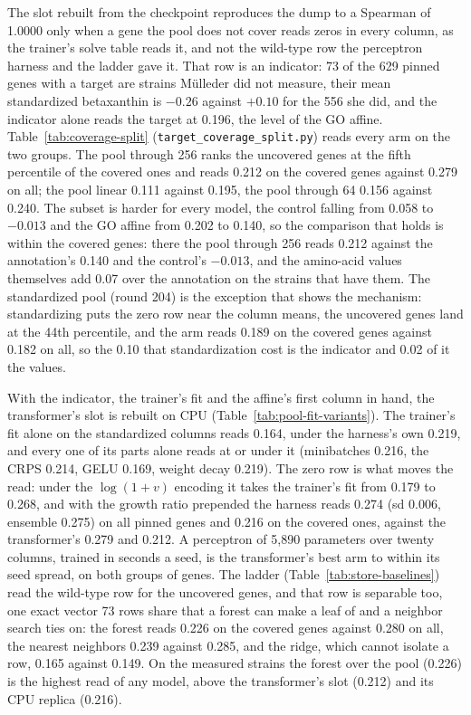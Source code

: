 The slot rebuilt from the checkpoint reproduces the dump to a Spearman of 1.0000 only
when a gene the pool does not cover reads zeros in every column, as the trainer's solve
table reads it, and not the wild-type row the perceptron harness and the ladder gave
it. That row is an indicator: 73 of the 629 pinned genes with a target are strains
M\"ulleder did not measure, their mean standardized betaxanthin is $-0.26$ against
$+0.10$ for the 556 she did, and the indicator alone reads the target at 0.196, the
level of the GO affine. Table~\ref{tab:coverage-split}
(\texttt{target\_coverage\_split.py}) reads every arm on the two groups. The pool
through 256 ranks the uncovered genes at the fifth percentile of the covered ones and
reads 0.212 on the covered genes against 0.279 on all; the pool linear 0.111 against
0.195, the pool through 64 0.156 against 0.240. The subset is harder for every model,
the control falling from 0.058 to $-0.013$ and the GO affine from 0.202 to 0.140, so
the comparison that holds is within the covered genes: there the pool through 256 reads
0.212 against the annotation's 0.140 and the control's $-0.013$, and the amino-acid
values themselves add 0.07 over the annotation on the strains that have them. The
standardized pool (round 204) is the exception that shows the mechanism: standardizing
puts the zero row near the column means, the uncovered genes land at the 44th
percentile, and the arm reads 0.189 on the covered genes against 0.182 on all, so the
0.10 that standardization cost is the indicator and 0.02 of it the values.

With the indicator, the trainer's fit and the affine's first column in hand, the
transformer's slot is rebuilt on CPU (Table~\ref{tab:pool-fit-variants}). The trainer's
fit alone on the standardized columns reads 0.164, under the harness's own 0.219, and
every one of its parts alone reads at or under it (minibatches 0.216, the CRPS 0.214,
GELU 0.169, weight decay 0.219). The zero row is what moves the read: under the
$\log(1+v)$ encoding it takes the trainer's fit from 0.179 to 0.268, and with the
growth ratio prepended the harness reads 0.274 (sd 0.006, ensemble 0.275) on all pinned
genes and 0.216 on the covered ones, against the transformer's 0.279 and 0.212. A
perceptron of 5,890 parameters over twenty columns, trained in seconds a seed, is the
transformer's best arm to within its seed spread, on both groups of genes. The ladder
(Table~\ref{tab:store-baselines}) read the wild-type row for the uncovered genes, and
that row is separable too, one exact vector 73 rows share that a forest can make a leaf
of and a neighbor search ties on: the forest reads 0.226 on the covered genes against
0.280 on all, the nearest neighbors 0.239 against 0.285, and the ridge, which cannot
isolate a row, 0.165 against 0.149. On the measured strains the forest over the pool
(0.226) is the highest read of any model, above the transformer's slot (0.212) and its
CPU replica (0.216).

